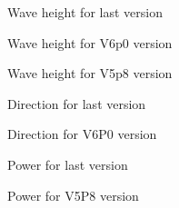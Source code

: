 \begin{figure} [!h]
\centering
{}
 \caption{Wave height for last version}
\label{figcalaishm0}
\end{figure}
\begin{figure} [!h]
\centering
{}
 \caption{Wave height for V6p0 version}
\label{figcalaishm0v6p0}
\end{figure}
\begin{figure} [!h]
\centering
{}
 \caption{Wave height for V5p8 version}
\label{figcalaishm0v5p8}
\end{figure}
\begin{figure} [!h]
\centering
{}
 \caption{Direction for last version}
\label{figcalaisdirection}
\end{figure}
\begin{figure} [!h]
\centering
{}
 \caption{Direction for V6P0  version}
\label{figcalaisdirectionV6P0}
\end{figure}
\begin{figure} [!h]
\centering
{}
 \caption{Power for last version}
\label{figcalaispower}
\end{figure}
\begin{figure} [!h]
\centering
{}
 \caption{Power for V5P8 version}
\label{figcalaispowerv5P8}
\end{figure}
